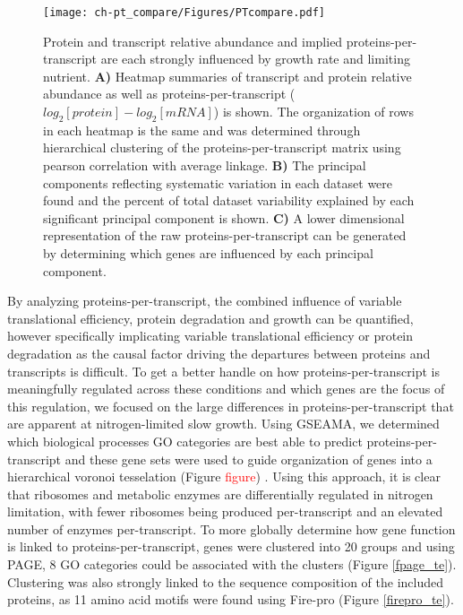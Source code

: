 \begin{figure}[h!]
\begin{center}
\texttt{[image: ch-pt\_compare/Figures/PTcompare.pdf]}
\caption{Protein and transcript relative abundance and implied proteins-per-transcript are each strongly influenced by growth rate and limiting nutrient. \textbf{A)} Heatmap summaries of transcript and protein relative abundance as well as proteins-per-transcript ($log_{2}\left[protein\right] - log_{2}\left[mRNA\right]$) is shown. The organization of rows in each heatmap is the same and was determined through hierarchical clustering of the proteins-per-transcript matrix using pearson correlation with average linkage. \textbf{B)} The principal components reflecting systematic variation in each dataset were found and the percent of total dataset variability explained by each significant principal component is shown. \textbf{C)} A lower dimensional representation of the raw proteins-per-transcript can be generated by determining which genes are influenced by each principal component.}
\label{ptHM}
\end{center}
\end{figure}

By analyzing proteins-per-transcript, the combined influence of variable translational efficiency, protein degradation and growth can be quantified, however specifically implicating variable translational efficiency or protein degradation as the causal factor driving the departures between proteins and transcripts is difficult. To get a better handle on how proteins-per-transcript is meaningfully regulated across these conditions and which genes are the focus of this regulation, we focused on the large differences in proteins-per-transcript that are apparent at nitrogen-limited slow growth.  Using GSEAMA, we determined which biological processes GO categories are best able to predict proteins-per-transcript and these gene sets were used to guide organization of genes into a hierarchical voronoi tesselation (Figure \textcolor{red}{figure}) \cite{Halligan:2007ds}.  Using this approach, it is clear that ribosomes and metabolic enzymes are differentially regulated in nitrogen limitation, with fewer ribosomes being produced per-transcript and an elevated number of enzymes per-transcript. To more globally determine how gene function is linked to proteins-per-transcript, genes were clustered into 20 groups and using PAGE, 8 GO categories could be associated with the clusters (Figure \ref{fpage_te}). Clustering was also strongly linked to the sequence composition of the included proteins, as 11 amino acid motifs were found using Fire-pro (Figure \ref{firepro_te}).

